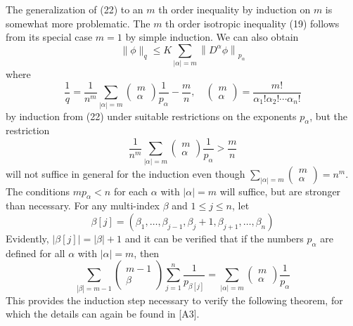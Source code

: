 \begin{para}
  The generalization of (22) to an $m$ th order inequality by induction on $m$ is somewhat more 
  problematic.
  The $m$ th order isotropic inequality (19) follows from its special case $m=1$ by simple induction. We can also obtain
  \[
  \|\phi\|_q \leq K \sum_{|\alpha|=m}\left\|D^\alpha \phi\right\|_{p_\alpha}
  \]
  where
  \[
  \frac{1}{q}=\frac{1}{n^m} \sum_{|\alpha|=m}\left(\begin{array}{c}
  m \\
  \alpha
  \end{array}\right) \frac{1}{p_\alpha}-\frac{m}{n}, \quad\left(\begin{array}{c}
  m \\
  \alpha
  \end{array}\right)=\frac{m !}{\alpha_{1} ! \alpha_{2} ! \cdots \alpha_{n} !}
  \]
  by induction from (22) under suitable restrictions on the exponents $p_\alpha$, but the restriction
  \[
  \frac{1}{n^m} \sum_{|\alpha|=m}\left(\begin{array}{l}
  m \\
  \alpha
  \end{array}\right) \frac{1}{p_\alpha}>\frac{m}{n}
  \]
  will not suffice in general for the induction even though $\sum_{|\alpha|=m}\left(\begin{array}{c}m \\ \alpha\end{array}\right)=n^m$. The conditions $m p_\alpha<n$ for each $\alpha$ with $|\alpha|=m$ will suffice, but are stronger than necessary.
  For any multi-index $\beta$ and $1 \leq j \leq n$, let
  \[
  \beta[j]=\left(\beta_1, \ldots, \beta_{j-1}, \beta_j+1, \beta_{j+1}, \ldots, \beta_n\right)
  \]
  Evidently, $|\beta[j]|=|\beta|+1$ and it can be verified that if the numbers $p_\alpha$ are defined for all $\alpha$ with $|\alpha|=m$, then
  \[
  \sum_{|\beta|=m-1}\left(\begin{array}{c}
  m-1 \\
  \beta
  \end{array}\right) \sum_{j=1}^n \frac{1}{p_{\beta[j]}}=\sum_{|\alpha|=m}\left(\begin{array}{c}
  m \\
  \alpha
  \end{array}\right) \frac{1}{p_\alpha}
  \]
  This provides the induction step necessary to verify the following theorem, for which the details can again be found in [A3].
\end{para}


